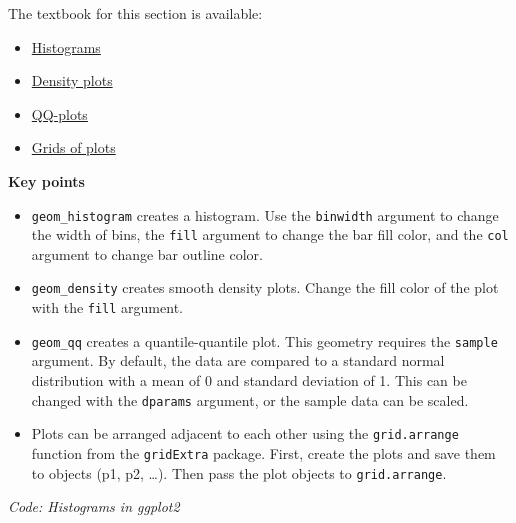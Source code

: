 \documentclass[
]{article}
\newenvironment{Shaded}{\begin{snugshade}}{\end{snugshade}}
\newcommand{\CommentTok}[1]{\textcolor[rgb]{0.56,0.35,0.01}{\textit{#1}}}
\newcommand{\DataTypeTok}[1]{\textcolor[rgb]{0.13,0.29,0.53}{#1}}
\newcommand{\KeywordTok}[1]{\textcolor[rgb]{0.13,0.29,0.53}{\textbf{#1}}}
\newcommand{\NormalTok}[1]{#1}
\newcommand{\OperatorTok}[1]{\textcolor[rgb]{0.81,0.36,0.00}{\textbf{#1}}}
\newcommand{\StringTok}[1]{\textcolor[rgb]{0.31,0.60,0.02}{#1}}
\providecommand{\tightlist}{%
  \setlength{\itemsep}{0pt}\setlength{\parskip}{0pt}}
\begin{document}
The textbook for this section is available:

\begin{itemize}
\tightlist
\item
  \href{https://rafalab.github.io/dsbook/distributions.html\#histograms-1}{Histograms}
\item
  \href{https://rafalab.github.io/dsbook/distributions.html\#density-plots}{Density
  plots}
\item
  \href{https://rafalab.github.io/dsbook/distributions.html\#qq-plots}{QQ-plots}
\item
  \href{https://rafalab.github.io/dsbook/ggplot2.html\#grids-of-plots}{Grids
  of plots}
\end{itemize}

\textbf{Key points}

\begin{itemize}
\tightlist
\item
  \texttt{geom\_histogram} creates a histogram. Use the
  \texttt{binwidth} argument to change the width of bins, the
  \texttt{fill} argument to change the bar fill color, and the
  \texttt{col} argument to change bar outline color.
\item
  \texttt{geom\_density} creates smooth density plots. Change the fill
  color of the plot with the \texttt{fill} argument.
\item
  \texttt{geom\_qq} creates a quantile-quantile plot. This geometry
  requires the \texttt{sample} argument. By default, the data are
  compared to a standard normal distribution with a mean of 0 and
  standard deviation of 1. This can be changed with the \texttt{dparams}
  argument, or the sample data can be scaled.
\item
  Plots can be arranged adjacent to each other using the
  \texttt{grid.arrange} function from the \texttt{gridExtra} package.
  First, create the plots and save them to objects (p1, p2, \ldots).
  Then pass the plot objects to \texttt{grid.arrange}.
\end{itemize}

\emph{Code: Histograms in ggplot2}

\begin{Shaded}
\end{Shaded}
\end{document}
